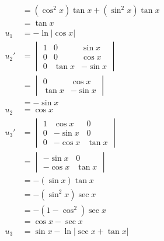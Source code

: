 \documentclass{article}
\begin{document}
\begin{align*}
       & = (\cos^2 x) \tan x + (\sin^2 x) \tan x                            \\
       & = \tan x                                                           \\
  u_1  & = -\ln |\cos x|                                                    \\
  u_2' & = \begin{vmatrix}
             1 & 0      & \sin x  \\
             0 & 0      & \cos x  \\
             0 & \tan x & -\sin x
           \end{vmatrix}                                             \\
       & = \begin{vmatrix}
             0      & \cos x  \\
             \tan x & -\sin x
           \end{vmatrix}                                                 \\
       & = -\sin x                                                          \\
  u_2  & = \cos x                                                           \\
  u_3' & = \begin{vmatrix}
             1 & \cos x  & 0      \\
             0 & -\sin x & 0      \\
             0 & -\cos x & \tan x
           \end{vmatrix}                                             \\
       & = \begin{vmatrix}
             -\sin x & 0      \\
             -\cos x & \tan x
           \end{vmatrix}                                                 \\
       & = -(\sin x) \tan x                                                 \\
       & = -(\sin^2 x) \sec x                                               \\
       & = -(1 - \cos^2) \sec x                                             \\
       & = \cos x - \sec x                                                  \\
  u_3  & = \sin x - \ln |\sec x + \tan x|
\end{align*}
\end{document}
